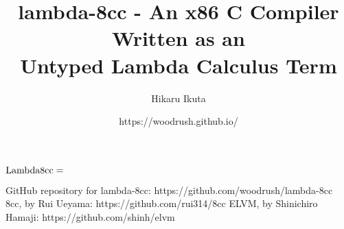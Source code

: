 \documentclass[article, 12pt]{article}
\title{lambda-8cc - An x86 C Compiler Written as an \\ Untyped Lambda Calculus Term}
\author{Hikaru Ikuta}
\date{https://woodrush.github.io/}
\begin{document}
\maketitle
${\rm Lambda8cc} =$

\begin{thebibliography}{A99}
     GitHub repository for lambda-8cc: https://github.com/woodrush/lambda-8cc
     8cc, by Rui Ueyama: https://github.com/rui314/8cc
     ELVM, by Shinichiro Hamaji: https://github.com/shinh/elvm
\end{thebibliography}
\end{document}
